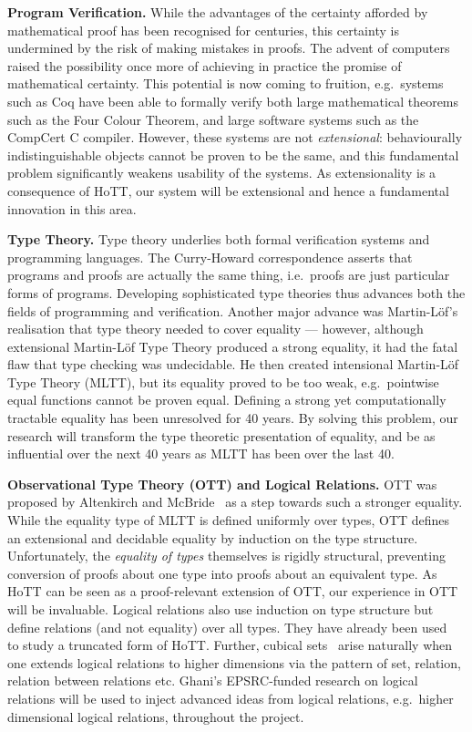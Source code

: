 \documentclass[a4paper,11pt]{article}
\newcommand{\eg}{{e.g.}\ }
\begin{document}
{\bf Program Verification.} While the advantages of the certainty
afforded by mathematical proof has been recognised for centuries, this
certainty is undermined by the risk of making mistakes in
proofs. The advent of computers raised the possibility once more of
achieving in practice the promise of mathematical certainty. This
potential is now coming to fruition, \eg systems such as Coq have been
able to formally verify both large mathematical theorems such as the
Four Colour Theorem, and large software systems such as the CompCert
C compiler. However, these systems are not {\em extensional}:
behaviourally indistinguishable objects cannot be proven to be the
same, and this fundamental problem significantly weakens usability of the
systems. As extensionality is a consequence of HoTT, our system
will be extensional and hence a fundamental innovation in this area.


{\bf Type Theory.} Type theory underlies both formal verification
systems and programming languages. The Curry-Howard correspondence
asserts that programs and proofs are actually the same thing, i.e.\
proofs are just particular forms of programs. Developing
sophisticated type theories thus advances both the fields of
programming and verification. Another major advance was Martin-L\"of's
realisation that type theory needed to cover equality --- however,
although extensional Martin-L\"of Type Theory produced a strong
equality, it had the fatal flaw that type checking was undecidable. He
then created intensional Martin-L\"of Type Theory (MLTT), but its
equality proved to be too weak, \eg pointwise equal functions cannot
be proven equal. Defining a strong yet computationally tractable
equality has been unresolved for 40 years. By solving this problem,
our research will transform the type theoretic presentation of
equality, and be as influential over the next 40 years as MLTT has been
over the last 40.



{\bf Observational Type Theory (OTT) and Logical Relations.} OTT was
proposed by Altenkirch and McBride~\cite{alti:ott-conf} as a step
towards such a stronger equality. While the equality type of MLTT is
defined uniformly over types, OTT defines an extensional and decidable
equality by induction on the type structure. Unfortunately, the {\em
  equality of types} themselves is rigidly structural, preventing
conversion of proofs about one type into proofs about an equivalent
type. As HoTT can be seen as a proof-relevant extension of OTT, our
experience in OTT will be invaluable. Logical relations also use
induction on type structure but define relations (and not equality)
over all types.  They have already been
used~\cite{licataHarper:canonicity2d} to study a truncated form of
HoTT. Further, cubical sets~\cite{BezemM:cubsmt} arise naturally when
one extends logical relations to higher dimensions via the pattern of
set, relation, relation between relations etc. Ghani's EPSRC-funded
research on logical relations will be used to inject advanced ideas
from logical relations, \eg higher dimensional logical relations,
throughout the project.
\end{document}
